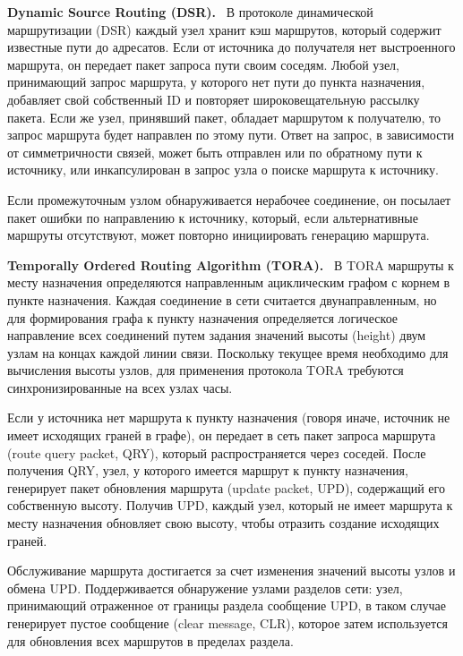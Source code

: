 \documentclass[14pt,a4paper,titlepage]{extarticle}
\renewcommand{\paragraph}[1]{\textbf{#1.}~}
\begin{document}
\paragraph{Dynamic Source Routing (DSR)}
В протоколе динамической маршрутизации (DSR) каждый узел хранит кэш маршрутов, который содержит известные пути до адресатов. Если от источника до получателя нет выстроенного маршрута, он передает пакет запроса пути своим соседям. Любой узел, принимающий запрос маршрута, у которого нет пути до пункта назначения, добавляет свой собственный ID и повторяет широковещательную рассылку пакета. Если же узел, принявший пакет, обладает маршрутом к получателю, то запрос маршрута будет направлен по этому пути. Ответ на запрос, в зависимости от симметричности связей, может быть отправлен или по обратному пути к источнику, или инкапсулирован в запрос узла о поиске маршрута к источнику. 

Если промежуточным узлом обнаруживается нерабочее соединение, он посылает пакет ошибки по направлению к источнику, который, если альтернативные маршруты отсутствуют, может повторно инициировать генерацию маршрута.

\paragraph{Temporally Ordered Routing Algorithm (TORA)}
В TORA маршруты к месту назначения определяются направленным ациклическим графом с корнем в пункте назначения. Каждая соединение в сети считается двунаправленным, но для формирования графа к пункту назначения определяется логическое направление всех соединений путем задания значений высоты (height) двум узлам на концах каждой линии связи. Поскольку текущее время необходимо для вычисления высоты узлов, для применения протокола TORA требуются синхронизированные на всех узлах часы. 

Если у источника нет маршрута к пункту назначения (говоря иначе, источник не имеет исходящих граней в графе), он передает в сеть пакет запроса маршрута (route query packet, QRY), который распространяется через соседей. После получения QRY, узел, у которого имеется маршрут к пункту назначения, генерирует пакет обновления маршрута (update packet, UPD), содержащий его собственную высоту. Получив UPD, каждый узел, который не имеет маршрута к месту назначения обновляет свою высоту, чтобы отразить создание исходящих граней. 

Обслуживание маршрута достигается за счет изменения значений высоты узлов и обмена UPD. Поддерживается обнаружение узлами разделов сети: узел, принимающий отраженное от границы раздела сообщение UPD, в таком случае генерирует пустое сообщение (clear message, CLR), которое затем используется для обновления всех маршрутов в пределах раздела.
\end{document}
